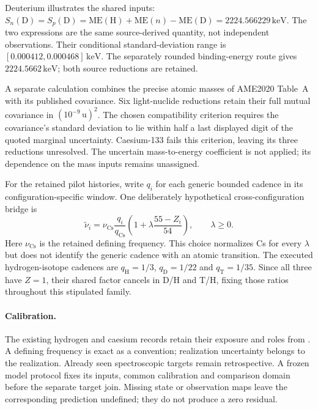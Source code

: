 Deuterium illustrates the shared inputs:
\(S_n(\mathrm D)=S_p(\mathrm D)
=\mathrm{ME}(\mathrm H)+\mathrm{ME}(n)-\mathrm{ME}(\mathrm D)
=2224.566229\,\mathrm{keV}\).
The two expressions are the same source-derived quantity, not independent
observations. Their conditional standard-deviation range is
\([0.000412,0.000468]\,\mathrm{keV}\). The separately rounded binding-energy
route gives \(2224.5662\,\mathrm{keV}\); both source reductions are retained.

A separate calculation combines the precise atomic masses of AME2020
Table~A\cite[Table~A]{iupac-ame} with its published covariance. Six light-nuclide
reductions retain their full mutual covariance in \((10^{-9}\,\mathrm u)^2\).
The chosen compatibility criterion requires the covariance's standard deviation
to lie within half a last displayed digit of the quoted marginal uncertainty.
Caesium-133 fails this criterion, leaving its three reductions unresolved.
The uncertain mass-to-energy coefficient is not applied; its dependence on
the mass inputs remains unassigned.

For the retained pilot histories, write \(q_i\) for each generic bounded
cadence in its configuration-specific window. One deliberately hypothetical
cross-configuration bridge is
\begin{equation}
 \widetilde\nu_i=\nu_{\mathrm{Cs}}\frac{q_i}{q_{\mathrm{Cs}}}
 \left(1+\lambda\frac{55-Z_i}{54}\right),\qquad \lambda\geq0.
 \label{eq:manual2-property-bridge-family}
\end{equation}
Here \(\nu_{\mathrm{Cs}}\) is the retained defining frequency. This choice
normalizes Cs for every \(\lambda\) but does not identify the generic cadence
with an atomic transition. The executed hydrogen-isotope cadences are
\(q_{\mathrm H}=1/3\), \(q_{\mathrm D}=1/22\) and
\(q_{\mathrm T}=1/35\). Since all three have \(Z=1\), their shared factor
cancels in D/H and T/H, fixing those ratios throughout this stipulated family.

\paragraph{Calibration.}
The existing hydrogen and caesium records retain their exposure and roles from
. A defining frequency is exact as a
convention; realization uncertainty belongs to the realization. Already seen
spectroscopic targets remain retrospective. A frozen model protocol fixes its
inputs, common calibration and comparison domain before the separate target
join. Missing state or observation maps leave the corresponding prediction
undefined; they do not produce a zero residual.

